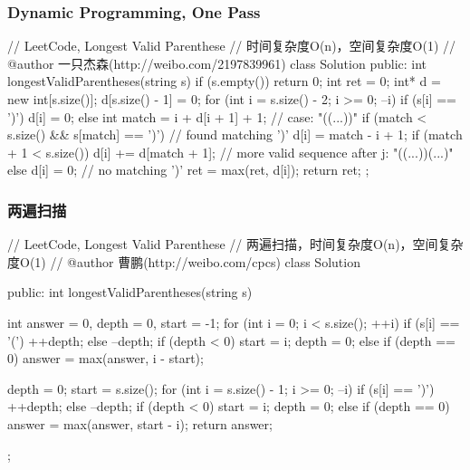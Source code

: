 \subsubsection{Dynamic Programming, One Pass}
\begin{Code}
// LeetCode, Longest Valid Parenthese
// 时间复杂度O(n)，空间复杂度O(1)
// @author 一只杰森(http://weibo.com/2197839961)
class Solution {
public:
    int longestValidParentheses(string s) {
        if (s.empty()) return 0;
        int ret = 0;
        int* d = new int[s.size()];
        d[s.size() - 1] = 0;
        for (int i = s.size() - 2; i >= 0; --i) {
            if (s[i] == ')') d[i] = 0;
            else {
                int match = i + d[i + 1] + 1;  // case: "((...))"
                if (match < s.size() && s[match] == ')') {  // found matching ')'
                    d[i] = match - i + 1;
                    if (match + 1 < s.size()) d[i] += d[match + 1];  // more valid sequence after j: "((...))(...)"
                } else {
                    d[i] = 0;  // no matching ')'
                }
            }
            ret = max(ret, d[i]);
        }
        return ret;
    }
};
\end{Code}


\subsubsection{两遍扫描}
\begin{Code}
// LeetCode, Longest Valid Parenthese
// 两遍扫描，时间复杂度O(n)，空间复杂度O(1)
// @author 曹鹏(http://weibo.com/cpcs)
class Solution {
public:
    int longestValidParentheses(string s) {
        int answer = 0, depth = 0, start = -1;
        for (int i = 0; i < s.size(); ++i) {
            if (s[i] == '(') {
                ++depth;
            } else {
                --depth;
                if (depth < 0) {
                    start = i;
                    depth = 0;
                } else if (depth == 0) {
                    answer = max(answer, i - start);
                }
            } 
        }

        depth = 0;
        start = s.size();
        for (int i = s.size() - 1; i >= 0; --i) {
            if (s[i] == ')') {
                ++depth;
            } else {
                --depth;
                if (depth < 0) {
                    start = i;
                    depth = 0;
                } else if (depth == 0) {
                    answer = max(answer, start - i);
                }
            } 
        }
        return answer;
    }
};
\end{Code}


